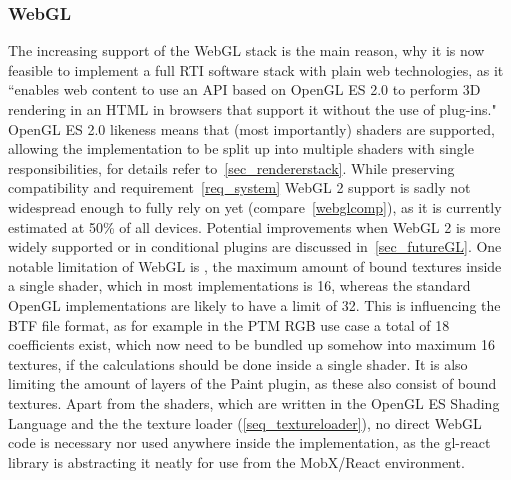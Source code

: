 \subsubsection*{WebGL}
The increasing support of the WebGL stack is the main reason, why
  it is now feasible to implement a full RTI software stack with plain web
  technologies, as it ``enables web content to use an API based on OpenGL ES 2.0
  to perform 3D rendering in an HTML  in browsers that support it
  without the use of plug-ins."\cite*{noauthor_webgl_nodate-1} OpenGL ES 2.0
  likeness means that (most importantly) shaders are supported, allowing the
  implementation to be split up into multiple shaders with single
  responsibilities, for details refer to~\autoref{sec_rendererstack}. While preserving compatibility and
  requirement~\ref{req_system} WebGL 2 support is sadly not widespread enough to fully rely on yet
  (compare~\autoref{webglcomp}), as it is currently estimated at 50\% of all devices\cite*{noauthor_webgl_nodate-2}.
    Potential improvements
  when WebGL 2 is more widely supported or in conditional plugins are discussed
  in~\autoref{sec_futureGL}. One notable limitation of WebGL is
  , the maximum amount of bound textures inside a
  single shader, which in most implementations is
  16\cite*{noauthor_webgl_nodate-3}, whereas the standard OpenGL implementations
  are likely to have a limit of 32. This is influencing the BTF file format, as
  for example in the PTM RGB use case a total of 18 coefficients exist, which
  now need to be bundled up somehow into maximum 16 textures, if the
  calculations should be done inside a single shader. It is also limiting the
  amount of layers of the Paint plugin, as these also consist of bound textures.
  Apart from the shaders, which are written in the OpenGL ES
  Shading Language\cite*{noauthor_webgl_nodate-4} and the the texture loader (\autoref{seq_textureloader}), no direct
  WebGL code is necessary nor used anywhere inside the implementation, as the
  gl-react library is abstracting it neatly for use from the MobX/React environment.

